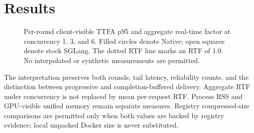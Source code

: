 \section{Results}
\label{sec:results}

\ifFinalEvidenceAvailable
  \VerifiedResultSummary
\else
  \EvidenceWarning
  \VerifiedResultSummary
\fi



\begin{figure}[t]
  \centering
  
  \caption{Per-round client-visible TTFA p95 and aggregate real-time factor at
  concurrency 1, 3, and 6. Filled circles denote Native; open squares denote
  stock SGLang. The dotted RTF line marks an RTF of 1.0. No interpolated
  or synthetic measurements are permitted.}
  \label{fig:performance-summary}
\end{figure}




The interpretation preserves both rounds, tail latency, reliability counts,
and the distinction between progressive and completion-buffered delivery.
Aggregate RTF under concurrency is not replaced by mean per-request RTF.
Process RSS and GPU-visible unified memory remain separate measures. Registry
compressed-size comparisons are permitted only when both values are backed by
registry evidence; local unpacked Docker size is never substituted.
